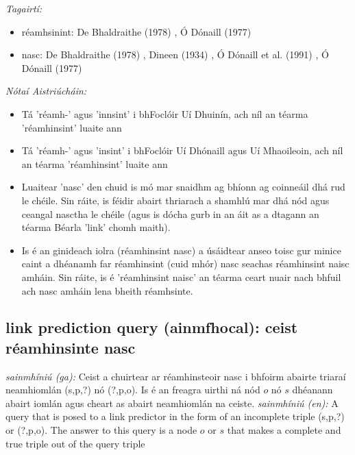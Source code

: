 \documentclass{article}
\begin{document}
 \noindent \textit{Tagairtí:}
\begin{itemize}
	\item réamhsinint: De Bhaldraithe (1978) \cite{de-bhaldraithe}, Ó Dónaill (1977) \cite{odonaill}
	\item nasc: De Bhaldraithe (1978) \cite{de-bhaldraithe}, Dineen (1934) \cite{dineen}, Ó Dónaill et al. (1991) \cite{focloir-beag}, Ó Dónaill (1977) \cite{odonaill}
\end{itemize}

 \noindent \textit{Nótaí Aistriúcháin:}
\begin{itemize}
	\item Tá 'réamh-' agus 'innsint' i bhFoclóir Uí Dhuinín, ach níl an téarma 'réamhinsint' luaite ann
	\item Tá 'réamh-' agus 'insint' i bhFoclóir Uí Dhónaill agus Uí Mhaoileoin, ach níl an téarma 'réamhinsint' luaite ann
	\item Luaitear 'nasc' den chuid is mó mar snaidhm ag bhíonn ag coinneáil dhá rud le chéile. Sin ráite, is féidir abairt thriarach a shamhlú mar dhá nód agus ceangal nasctha le chéile (agus is dócha gurb in an áit as a dtagann an téarma Béarla 'link' chomh maith).
	\item Is é an ginideach iolra (réamhinsint nasc) a úsáidtear anseo toisc gur minice caint a dhéanamh far réamhinsint (cuid mhór) nasc seachas réamhinsint naisc amháin. Sin ráite, is é 'réamhinsint naisc' an téarma ceart nuair nach bhfuil ach nasc amháin lena bheith réamhsinte.
\end{itemize}


\subsection*{link prediction query (ainmfhocal): ceist réamhinsinte nasc} 
 \noindent \textit{sainmhíniú (ga):} Ceist a chuirtear ar réamhinsteoir nasc i bhfoirm abairte triaraí neamhiomlán (s,p,?) nó (?,p,o). Is é an freagra uirthi ná nód $o$ nó $s$ dhéanann abairt iomlán agus cheart as abairt neamhiomlán na ceiste.
\newline\newline
 \noindent \textit{sainmhíniú (en):} A query that is posed to a link predictor in the form of an incomplete triple (s,p,?) or (?,p,o). The answer to this query is a node $o$ or $s$ that makes a complete and true triple out of the query triple
\newline
\end{document}
